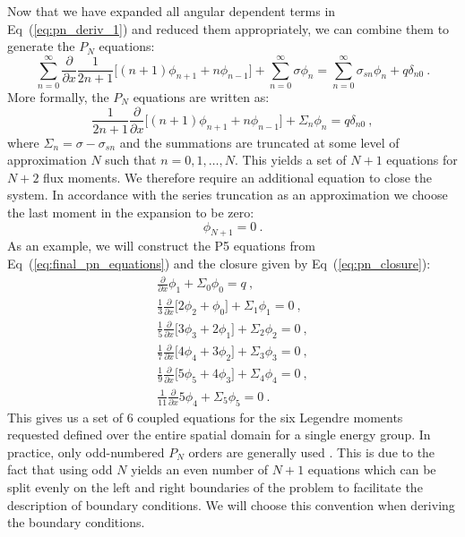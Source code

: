 \documentclass[letterpaper,12pt]{article}
\begin{document}
Now that we have expanded all angular dependent terms in
Eq~(\ref{eq:pn_deriv_1}) and reduced them appropriately, we can
combine them to generate the $P_N$ equations:
\begin{equation}
    \sum_{n=0}^\infty \frac{\partial}{\partial x} \frac{1}{2n+1} \Big[
      (n+1) \phi_{n+1} + n \phi_{n-1} \Big] + \sum_{n=0}^\infty \sigma
    \phi_n = \sum_{n=0}^\infty \sigma_{sn} \phi_n + q\delta_{n0}\:.
  \label{eq:pn_deriv_18}
\end{equation}
More formally, the $P_N$ equations are written as:
\begin{equation}
   \frac{1}{2n+1} \frac{\partial}{\partial x}\Big[ (n+1) \phi_{n+1} + n
     \phi_{n-1} \Big] + \Sigma_n \phi_n = q\delta_{n0} \:,
  \label{eq:final_pn_equations}
\end{equation}
where $\Sigma_n = \sigma-\sigma_{sn}$ and the summations are truncated
at some level of approximation $N$ such that $n = 0,1,\dotsc,N$. This
yields a set of $N+1$ equations for $N+2$ flux moments. We therefore
require an additional equation to close the system. In accordance with
the series truncation as an approximation we choose the last moment in
the expansion to be zero:
\begin{equation}
  \phi_{N+1} = 0\:.
  \label{eq:pn_closure}
\end{equation}
As an example, we will construct the P5 equations from
Eq~(\ref{eq:final_pn_equations}) and the closure given by
Eq~(\ref{eq:pn_closure}):
\begin{subequations}
  \begin{gather}
   \frac{\partial}{\partial x}\phi_{1} + \Sigma_0 \phi_0 = q\:,\\ 
   \frac{1}{3} \frac{\partial}{\partial x}\Big[ 2
     \phi_{2} + \phi_{0} \Big] + \Sigma_1 \phi_1 = 0\:,\\
   \frac{1}{5} \frac{\partial}{\partial x}\Big[ 3 \phi_{3} + 2
     \phi_{1} \Big] + \Sigma_2 \phi_2 = 0 \:,\\
   \frac{1}{7} \frac{\partial}{\partial x}\Big[ 4 \phi_{4} + 3
     \phi_{2} \Big] + \Sigma_3 \phi_3 = 0 \:,\\
   \frac{1}{9} \frac{\partial}{\partial x}\Big[ 5 \phi_{5} + 4
     \phi_{3} \Big] + \Sigma_4 \phi_4 = 0 \:,\\
   \frac{1}{11} \frac{\partial}{\partial x} 5 \phi_{4} + \Sigma_5
   \phi_5 = 0 \:.
  \end{gather}
  \label{eq:p5_equations}
\end{subequations}
This gives us a set of 6 coupled equations for the six Legendre
moments requested defined over the entire spatial domain for a single
energy group. In practice, only odd-numbered $P_N$ orders are
generally used \cite{lewis_computational_1993}. This is due to the
fact that using odd $N$ yields an even number of $N+1$ equations which
can be split evenly on the left and right boundaries of the problem to
facilitate the description of boundary conditions. We will choose this
convention when deriving the boundary conditions.
\end{document}
